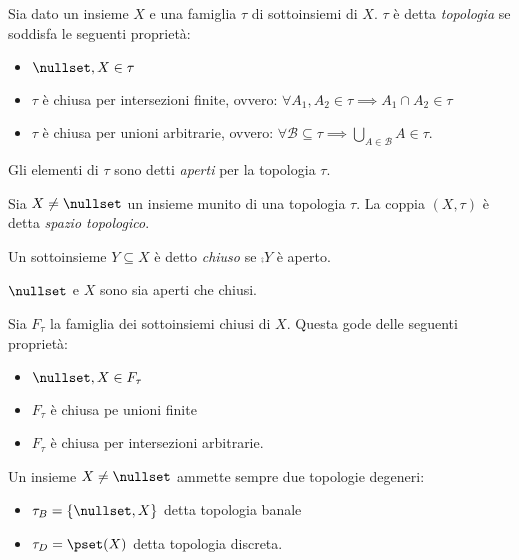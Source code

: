


\begin{defn}[Topologia]
	Sia dato un insieme $X$ e una famiglia $\tau$ di sottoinsiemi di $X$. $\tau$ è detta \emph{topologia} se soddisfa le seguenti proprietà:
	\begin{itemize}
		\item $\nullset,X\in\tau$ 
		\item $\tau$ è chiusa per intersezioni finite, ovvero:
		$\forall A_1, A_2 \in \tau \implies A_1 \cap A_2 \in \tau$
		\item $\tau$ è chiusa per unioni arbitrarie, ovvero:
		$\forall \mathcal B \subseteq \tau \implies \bigcup_{A\in\mathcal B} A \in \tau$.
	\end{itemize}
	Gli elementi di $\tau$ sono detti \emph{aperti} per la topologia $\tau$.
\end{defn}

\begin{defn}
	Sia $X \neq \nullset$ un insieme munito di una topologia $\tau$. La coppia $(X,\tau)$ è detta \emph{spazio topologico}.
\end{defn}

\begin{defn}[Chiuso]
	Un sottoinsieme $Y \subseteq X$ è detto \emph{chiuso} se $\comp Y$ è aperto.
\end{defn}

\begin{oss}
	$\nullset$ e $X$ sono sia aperti che chiusi.
\end{oss}

\begin{prop}
	Sia $F_\tau$ la famiglia dei sottoinsiemi chiusi di $X$. Questa gode delle seguenti proprietà:
	\begin{itemize}
		\item $\nullset ,X \in F_\tau$ 
		\item $F_\tau$ è chiusa pe unioni finite
		\item $F_\tau$ è chiusa per intersezioni arbitrarie.
	\end{itemize}
\end{prop}

\begin{oss}
	Un insieme $X\neq\nullset$ ammette sempre due topologie degeneri:
	\begin{itemize}
		\item $\tau_B = \{\nullset,X\}$ detta topologia banale
		\item $\tau_D = \pset(X)$ detta topologia discreta.
	\end{itemize}
\end{oss}

